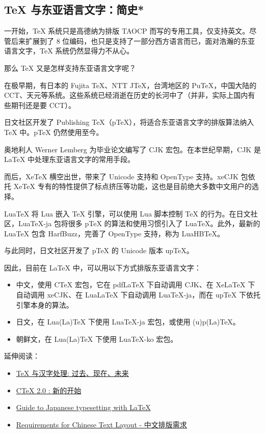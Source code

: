 \documentclass[a4paper,fontset=none]{ctexart}
\begin{document}
\subsection{TeX 与东亚语言文字：简史*}

一开始，TeX 系统只是高德纳为排版 TAOCP 而写的专用工具，仅支持英文。尽管后来扩展到了 8 位编码，也只是支持了一部分西方语言而已，面对浩瀚的东亚语言文字，TeX 系统仍然显得力不从心。

那么 TeX 又是怎样支持东亚语言文字呢？

在极早期，有日本的 Fujita TeX、NTT JTeX，台湾地区的 PuTeX，中国大陆的 CCT、天元等系统。这些系统已经消逝在历史的长河中了（并非，实际上国内有些期刊还是要 CCT）。

日文社区开发了 Publishing TeX（pTeX），将适合东亚语言文字的排版算法纳入 TeX 中。pTeX 仍然使用至今。

奥地利人 Werner Lemberg 为毕业论文编写了 CJK 宏包。在本世纪早期，CJK 是 LaTeX 中处理东亚语言文字的常用手段。

而后，XeTeX 横空出世，带来了 Unicode 支持和 OpenType 支持。xeCJK 包依托 XeTeX 专有的特性提供了标点挤压等功能，这也是目前绝大多数中文用户的选择。

LuaTeX 将 Lua 嵌入 TeX 引擎，可以使用 Lua 脚本控制 TeX 的行为。在日文社区，LuaTeX-ja 包将很多 pTeX 的算法和使用习惯引入了 LuaTeX。此外，最新的 LuaTeX 包含 HarfBuzz，完善了 OpenType 支持，称为 LuaHBTeX。

与此同时，日文社区开发了 pTeX 的 Unicode 版本 upTeX。

因此，目前在 LaTeX 中，可以用以下方式排版东亚语言文字：

\begin{itemize}
    \item 中文，使用 CTeX 宏包，它在 pdfLaTeX 下自动调用 CJK、在 XeLaTeX 下自动调用 xeCJK、在 LuaLaTeX 下自动调用 LuaTeX-ja，而在 upTeX 下依托引擎本身的算法。
    \item 日文，在 Lua(La)TeX 下使用 LuaTeX-ja 宏包，或使用 (u)p(La)TeX。
    \item 朝鲜文，在 Lua(La)TeX 下使用 LuaTeX-ko 宏包。
\end{itemize}

延伸阅读：

\begin{itemize}
    \item \href{https://tuna.moe/assets/slides/doc-ptex-ng-zh.pdf}{TeX 与汉字处理: 过去、现在、未来}
    \item \href{https://tuna.moe/assets/slides/ctex2talk.pdf}{CTeX 2.0 : 新的开始}
    \item \href{http://mirrors.ctan.org/macros/latex/contrib/babel-contrib/japanese/japanese.pdf}{Guide to Japanese typesetting with LaTeX}
    \item \href{https://www.w3.org/TR/clreq/}{Requirements for Chinese Text Layout - 中文排版需求}
\end{itemize}
\end{document}
